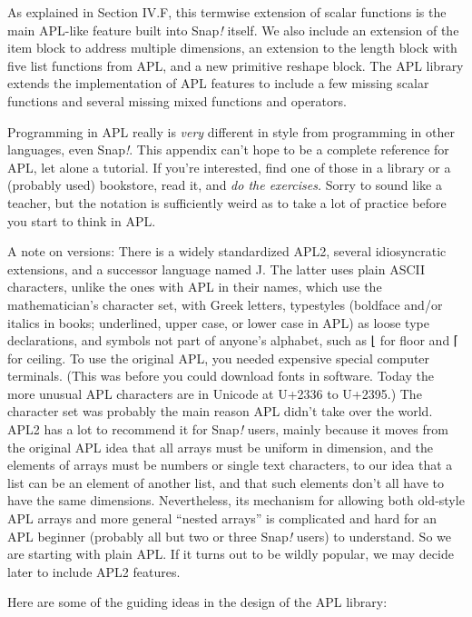As explained in Section IV.F, this termwise extension of scalar
functions is the main APL-like feature built into Snap\emph{!} itself.
We also include an extension of the item block to address multiple
dimensions, an extension to the length block with five list functions
from APL, and a new primitive reshape block. The APL library extends the
implementation of APL features to include a few missing scalar functions
and several missing mixed functions and operators.

Programming in APL really is \emph{very} different in style from
programming in other languages, even Snap\emph{!}. This appendix can't
hope to be a complete reference for APL, let alone a tutorial. If you're
interested, find one of those in a library or a (probably used)
bookstore, read it, and \emph{do the exercises.} Sorry to sound like a
teacher, but the notation is sufficiently weird as to take a lot of
practice before you start to think in APL.

A note on versions: There is a widely standardized APL2, several
idiosyncratic extensions, and a successor language named J. The latter
uses plain ASCII characters, unlike the ones with APL in their names,
which use the mathematician's character set, with Greek letters,
typestyles (boldface and/or italics in books; underlined, upper case, or
lower case in APL) as loose type declarations, and symbols not part of
anyone's alphabet, such as ⌊ for floor and ⌈ for ceiling. To use the
original APL, you needed expensive special computer terminals. (This was
before you could download fonts in software. Today the more unusual APL
characters are in Unicode at U+2336 to U+2395.) The character set was
probably the main reason APL didn't take over the world. APL2 has a lot
to recommend it for Snap\emph{!} users, mainly because it moves from the
original APL idea that all arrays must be uniform in dimension, and the
elements of arrays must be numbers or single text characters, to our
idea that a list can be an element of another list, and that such
elements don't all have to have the same dimensions. Nevertheless, its
mechanism for allowing both old-style APL arrays and more general
``nested arrays'' is complicated and hard for an APL beginner (probably
all but two or three Snap\emph{!} users) to understand. So we are
starting with plain APL. If it turns out to be wildly popular, we may
decide later to include APL2 features.

Here are some of the guiding ideas in the design of the APL library:

